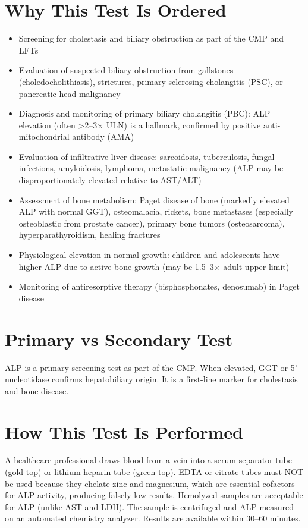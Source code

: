 \section*{Why This Test Is Ordered}
\begin{itemize}
  \item Screening for cholestasis and biliary obstruction as part of the CMP and LFTs
  \item Evaluation of suspected biliary obstruction from gallstones (choledocholithiasis), strictures, primary sclerosing cholangitis (PSC), or pancreatic head malignancy
  \item Diagnosis and monitoring of primary biliary cholangitis (PBC): ALP elevation (often >2--3$\times$ ULN) is a hallmark, confirmed by positive anti-mitochondrial antibody (AMA) \cite{lindor2019primary}
  \item Evaluation of infiltrative liver disease: sarcoidosis, tuberculosis, fungal infections, amyloidosis, lymphoma, metastatic malignancy (ALP may be disproportionately elevated relative to AST/ALT)
  \item Assessment of bone metabolism: Paget disease of bone (markedly elevated ALP with normal GGT), osteomalacia, rickets, bone metastases (especially osteoblastic from prostate cancer), primary bone tumors (osteosarcoma), hyperparathyroidism, healing fractures
  \item Physiological elevation in normal growth: children and adolescents have higher ALP due to active bone growth (may be 1.5--3$\times$ adult upper limit)
  \item Monitoring of antiresorptive therapy (bisphosphonates, denosumab) in Paget disease
\end{itemize}

\section*{Primary vs Secondary Test}
ALP is a primary screening test as part of the CMP. When elevated, GGT or 5'-nucleotidase confirms hepatobiliary origin. It is a first-line marker for cholestasis and bone disease.

\section*{How This Test Is Performed}
A healthcare professional draws blood from a vein into a serum separator tube (gold-top) or lithium heparin tube (green-top). EDTA or citrate tubes must NOT be used because they chelate zinc and magnesium, which are essential cofactors for ALP activity, producing falsely low results. Hemolyzed samples are acceptable for ALP (unlike AST and LDH). The sample is centrifuged and ALP measured on an automated chemistry analyzer. Results are available within 30--60 minutes.

